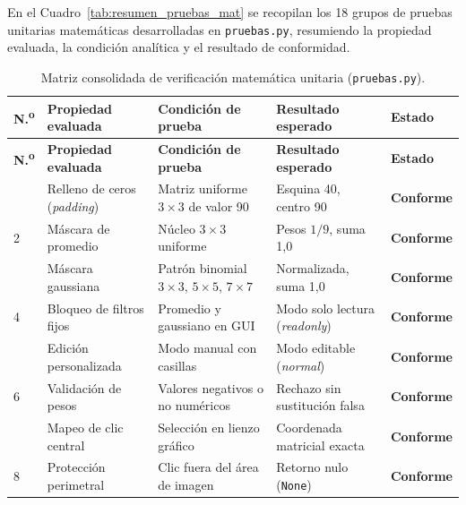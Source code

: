 \documentclass[11pt]{article}
\newcommand{\pruebaok}{\textcolor{verdeExito}{\textbf{Conforme}}}
\begin{document}
En el Cuadro~\ref{tab:resumen_pruebas_mat} se recopilan los 18 grupos de pruebas unitarias matemáticas desarrolladas en \texttt{pruebas.py}, resumiendo la propiedad evaluada, la condición analítica y el resultado de conformidad.

\begin{longtable}{>{\centering\arraybackslash}p{0.8cm}>{\raggedright\arraybackslash}p{4.2cm}>{\raggedright\arraybackslash}p{4.6cm}>{\centering\arraybackslash}p{2.2cm}>{\centering\arraybackslash}p{2.2cm}}
\caption{Matriz consolidada de verificación matemática unitaria (\texttt{pruebas.py}).}\\
\toprule
\textbf{N.\textsuperscript{o}} & \textbf{Propiedad evaluada} & \textbf{Condición de prueba} & \textbf{Resultado esperado} & \textbf{Estado} \\
\midrule\endfirsthead
\toprule
\textbf{N.\textsuperscript{o}} & \textbf{Propiedad evaluada} & \textbf{Condición de prueba} & \textbf{Resultado esperado} & \textbf{Estado} \\
\midrule\endhead
1 & Relleno de ceros (\textit{padding}) & Matriz uniforme $3\times3$ de valor 90 & Esquina 40, centro 90 & \pruebaok \\
\cellcolor{azulClaro!40}2 & \cellcolor{azulClaro!40}Máscara de promedio & \cellcolor{azulClaro!40}Núcleo $3\times3$ uniforme & \cellcolor{azulClaro!40}Pesos $1/9$, suma 1,0 & \cellcolor{azulClaro!40}\pruebaok \\
3 & Máscara gaussiana & Patrón binomial $3\times3$, $5\times5$, $7\times7$ & Normalizada, suma 1,0 & \pruebaok \\
\cellcolor{azulClaro!40}4 & \cellcolor{azulClaro!40}Bloqueo de filtros fijos & \cellcolor{azulClaro!40}Promedio y gaussiano en GUI & \cellcolor{azulClaro!40}Modo solo lectura (\textit{readonly}) & \cellcolor{azulClaro!40}\pruebaok \\
5 & Edición personalizada & Modo manual con casillas & Modo editable (\textit{normal}) & \pruebaok \\
\cellcolor{azulClaro!40}6 & \cellcolor{azulClaro!40}Validación de pesos & \cellcolor{azulClaro!40}Valores negativos o no numéricos & \cellcolor{azulClaro!40}Rechazo sin sustitución falsa & \cellcolor{azulClaro!40}\pruebaok \\
7 & Mapeo de clic central & Selección en lienzo gráfico & Coordenada matricial exacta & \pruebaok \\
\cellcolor{azulClaro!40}8 & \cellcolor{azulClaro!40}Protección perimetral & \cellcolor{azulClaro!40}Clic fuera del área de imagen & \cellcolor{azulClaro!40}Retorno nulo (\texttt{None}) & \cellcolor{azulClaro!40}\pruebaok \\

\end{longtable}
\end{document}
